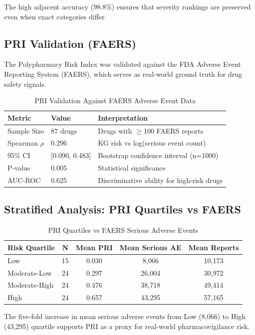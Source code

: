 \documentclass[11pt,a4paper]{article}
\begin{document}
The high adjacent accuracy (98.8\%) ensures that severity rankings are preserved even when exact categories differ.

\subsection{PRI Validation (FAERS)}

The Polypharmacy Risk Index was validated against the FDA Adverse Event Reporting System (FAERS), which serves as real-world ground truth for drug safety signals.

\begin{table}[H]
\centering
\caption{PRI Validation Against FAERS Adverse Event Data}
\label{tab:faers_validation}
\begin{tabular}{lll}
\toprule
\textbf{Metric} & \textbf{Value} & \textbf{Interpretation} \\
\midrule
Sample Size & 87 drugs & Drugs with $\geq$100 FAERS reports \\
Spearman $\rho$ & 0.296 & KG risk vs log(serious event count) \\
95\% CI & [0.090, 0.483] & Bootstrap confidence interval (n=1000) \\
P-value & 0.005 & Statistical significance \\
AUC-ROC & 0.625 & Discriminative ability for high-risk drugs \\
\bottomrule
\end{tabular}
\end{table}

\subsection{Stratified Analysis: PRI Quartiles vs FAERS}

\begin{table}[H]
\centering
\caption{PRI Quartiles vs FAERS Serious Adverse Events}
\label{tab:stratified_validation}
\begin{tabular}{lcccc}
\toprule
\textbf{Risk Quartile} & \textbf{N} & \textbf{Mean PRI} & \textbf{Mean Serious AE} & \textbf{Mean Reports} \\
\midrule
Low & 15 & 0.030 & 8,066 & 10,173 \\
Moderate-Low & 24 & 0.297 & 26,004 & 30,972 \\
Moderate-High & 24 & 0.476 & 38,718 & 49,414 \\
High & 24 & 0.657 & 43,295 & 57,165 \\
\bottomrule
\end{tabular}
\end{table}

The five-fold increase in mean serious adverse events from Low (8,066) to High (43,295) quartile supports PRI as a proxy for real-world pharmacovigilance risk.
\end{document}
